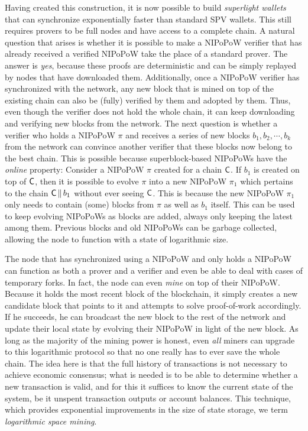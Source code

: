 Having created this construction, it is now possible to build \emph{superlight
wallets} that can synchronize exponentially faster than standard SPV wallets.
This still requires provers to be full nodes and have access to a complete
chain. A natural question that arises is whether it is possible to make a
NIPoPoW verifier that has already received a verified NIPoPoW take the place of
a standard prover. The answer is \emph{yes}, because these proofs are
deterministic and can be simply replayed by nodes that have downloaded them.
Additionally, once a NIPoPoW verifier has synchronized with the network, any new
block that is mined on top of the existing chain can also be (fully) verified by
them and adopted by them. Thus, even though the verifier does not hold the whole
chain, it can keep downloading and verifying new blocks from the network. The
next question is whether a verifier who holds a NIPoPoW $\pi$ and receives a
series of new blocks $b_1, b_2, \cdots, b_k$ from the network can convince
another verifier that these blocks now belong to the best chain. This is
possible because superblock-based NIPoPoWs have the \emph{online} property:
Consider a NIPoPoW $\pi$ created for a chain $\mathsf{C}$. If $b_1$ is created on
top of $\mathsf{C}$, then it is possible to evolve $\pi$ into a new NIPoPoW $\pi_1$
which pertains to the chain $\mathsf{C} \,\|\, b_1$ without ever seeing $\mathsf{C}$.
This is because the new NIPoPoW $\pi_1$ only needs to contain (some) blocks from
$\pi$ as well as $b_1$ itself. This can be used to keep evolving NIPoPoWs as
blocks are added, always only keeping the latest among them. Previous blocks
and old NIPoPoWs can be garbage collected, allowing the node to function with a
state of logarithmic size.

The node that has synchronized using a NIPoPoW and only holds a NIPoPoW can
function as both a prover and a verifier and even be able to deal with cases
of temporary forks. In fact, the node can even \emph{mine} on top of their
NIPoPoW. Because it holds the most recent block of the blockchain, it simply
creates a new candidate block that points to it and attempts to solve
proof-of-work accordingly. If he succeeds, he can broadcast the new block to the
rest of the network and update their local state by evolving their NIPoPoW in
light of the new block. As long as the majority of the mining power is honest,
even \emph{all} miners can upgrade to this logarithmic protocol so that no one
really has to ever save the whole chain. The idea here is that the full history
of transactions is not necessary to achieve economic consensus; what is needed
is to be able to determine whether a new transaction is valid, and for this it
suffices to know the current state of the system, be it unspent transaction
outputs or account balances. This technique, which provides exponential
improvements in the size of state storage, we term
\emph{logarithmic space mining}.

